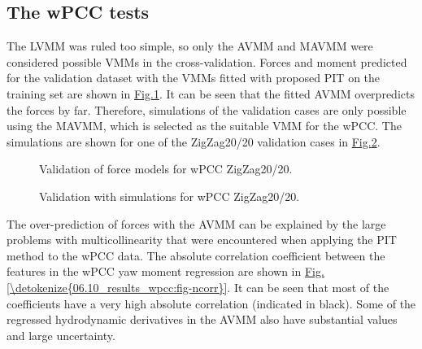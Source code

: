 \documentclass[review]{elsarticle}
\begin{document}
\subsection{The wPCC tests}
\label{\detokenize{06.10_results_wpcc:wpcc-tests}}\label{\detokenize{06.10_results_wpcc::doc}}
  
The LVMM was ruled too simple, so only the AVMM and MAVMM were considered possible VMMs in the cross-validation.
Forces and moment predicted for the validation dataset with the VMMs fitted with proposed PIT on the training set are shown in \hyperref[\detokenize{06.10_results_wpcc:fig-validation-forces}]{Fig.\@ \ref{\detokenize{06.10_results_wpcc:fig-validation-forces}}}. It can be seen that the fitted AVMM overpredicts the forces by far. Therefore, simulations of the validation cases are only possible using the MAVMM, which is selected as the suitable VMM for the wPCC.
The simulations are shown for one of the ZigZag20/20 validation cases in \hyperref[\detokenize{06.10_results_wpcc:fig-validation-sim}]{Fig.\@ \ref{\detokenize{06.10_results_wpcc:fig-validation-sim}}}.

 \begin{figure}[H]
 \centering
 \capstart

 \noindent{}
 \caption{Validation of force models for wPCC ZigZag20/20.}\label{\detokenize{06.10_results_wpcc:fig-validation-forces}}\end{figure}

 \begin{figure}[H]
 \centering
 \capstart

 \noindent{}
 \caption{Validation with simulations for wPCC ZigZag20/20.}\label{\detokenize{06.10_results_wpcc:fig-validation-sim}}\end{figure}

  
The over-prediction of forces with the AVMM can be explained by the large problems with multicollinearity that were encountered when applying the PIT method to the wPCC data. The absolute correlation coefficient between the features in the wPCC yaw moment regression are shown in \hyperref[\detokenize{06.10_results_wpcc:fig-ncorr}]{Fig.\@ \ref{\detokenize{06.10_results_wpcc:fig-ncorr}}}. It can be seen that most of the coefficients have a very high absolute correlation (indicated in black). Some of the regressed hydrodynamic derivatives in the AVMM also have substantial values and large uncertainty.
\end{document}
